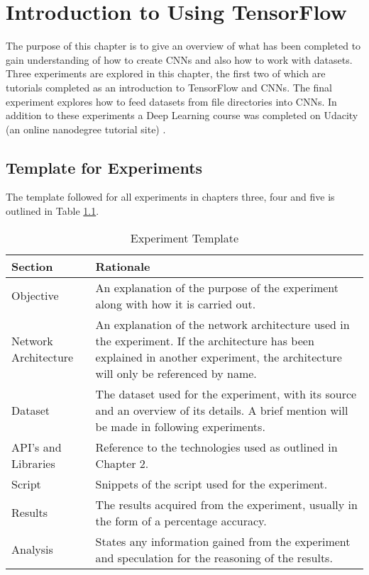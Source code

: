 \chapter{Introduction to Using TensorFlow}
The purpose of this chapter is to give an overview of what has been completed to gain understanding of how to create CNNs and also how to work with datasets.
Three experiments are explored in this chapter, the first two of which are tutorials completed as an introduction to TensorFlow and CNNs.
The final experiment explores how to feed datasets from file directories into CNNs.
In addition to these experiments a Deep Learning course was completed on Udacity (an online nanodegree tutorial site) \parencite{udacity}.

\section{Template for Experiments}
The template followed for all experiments in chapters three, four and five is outlined in Table \ref{expTemplate}.

\begin{table}[h]
\centering
\caption{Experiment Template}
\label{expTemplate}
\begin{tabular}{|p{3cm}|p{11cm}|}
\hline
\textbf{Section}   & \textbf{Rationale}                \\ \hline
Objective             & An explanation of the purpose of the experiment along with how it is carried out. \\ \hline
Network Architecture & An explanation of the network architecture used in the experiment. If the architecture has been explained in another experiment, the architecture will only be referenced by name.                       \\ \hline
Dataset              & The dataset used for the experiment, with its source and an overview of its details. A brief mention will be made in following experiments.                       \\ \hline
API's and Libraries               & Reference to the technologies used as outlined in Chapter 2.                      \\ \hline
Script               & Snippets of the script used for the experiment.                       \\ \hline
Results              & The results acquired from the experiment, usually in the form of a percentage accuracy.                       \\ \hline
Analysis   & States any information gained from the experiment and speculation for the reasoning of the results.                      \\ \hline
\end{tabular}
\end{table}

